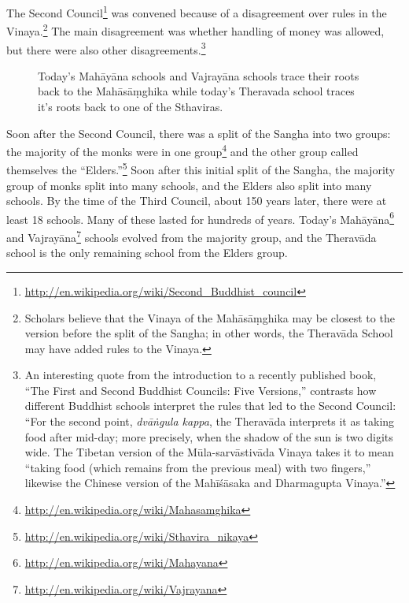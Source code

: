 The Second Council\footnote{\url{http://en.wikipedia.org/wiki/Second_Buddhist_council}} was convened because of a disagreement over rules in the Vinaya.\footnote{Scholars believe that the Vinaya of the Mahāsāṃghika may be closest to the version before the split of the Sangha; in other words, the Theravāda School may have added rules to the Vinaya.} The main disagreement was whether handling of money was allowed, but there were also other disagreements.\footnote{An interesting quote from the introduction to a recently published book, “The First and Second Buddhist Councils: Five Versions,” contrasts how different Buddhist schools interpret the rules that led to the Second Council: “For the second point, \textit{dvāṅgula kappa}, the Theravāda interprets it as taking food after mid-day; more precisely, when the shadow of the sun is two digits wide. The Tibetan version of the Mūla-sarvāstivāda Vinaya takes it to mean “taking food (which remains from the previous meal) with two fingers,” likewise the Chinese version of the Mahīśāsaka and Dharmagupta Vinaya.”}

\pagebreak

\begin{figure}[h]
\centering

\caption{Today’s Mahāyāna schools and Vajrayāna schools trace their roots back to the Mahāsāṃghika while today’s Theravada school traces it’s roots back to one of the Sthaviras.}
\label{fig:Schools}
\end{figure}

Soon after the Second Council, there was a split of the Sangha into two groups: the majority of the monks were in one group\footnote{\url{http://en.wikipedia.org/wiki/Mahasamghika}} and the other group called themselves the “Elders.”\footnote{\url{http://en.wikipedia.org/wiki/Sthavira_nikaya}} Soon after this initial split of the Sangha, the majority group of monks split into many schools, and the Elders also split into many schools. By the time of the Third Council, about 150 years later, there were at least 18 schools. Many of these lasted for hundreds of years. Today’s Mahāyāna\footnote{\url{http://en.wikipedia.org/wiki/Mahayana}} and Vajrayāna\footnote{\url{http://en.wikipedia.org/wiki/Vajrayana}} schools evolved from the majority group, and the Theravāda school is the only remaining school from the Elders group.

